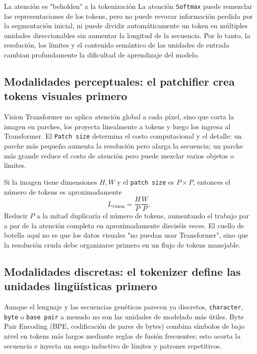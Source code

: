 
\begin{importantbox}{La atención es "beholden" a la tokenización}
La atención \texttt{Softmax} puede remezclar las representaciones de los tokens, pero no puede revocar información perdida por la segmentación inicial, ni puede dividir automáticamente un token en múltiples unidades direccionables sin aumentar la longitud de la secuencia. Por lo tanto, la resolución, los límites y el contenido semántico de las unidades de entrada cambian profundamente la dificultad de aprendizaje del modelo.
\end{importantbox}

\subsection{Modalidades perceptuales: el patchifier crea tokens visuales primero}

Vision Transformer no aplica atención global a cada píxel, sino que corta la imagen en parches, los proyecta linealmente a tokens y luego los ingresa al Transformer. El \texttt{Patch size} determina el costo computacional y el detalle: un parche más pequeño aumenta la resolución pero alarga la secuencia; un parche más grande reduce el costo de atención pero puede mezclar varios objetos o límites.


Si la imagen tiene dimensiones $H,W$ y el \texttt{patch size} es $P\times P$, entonces el número de tokens es aproximadamente
\[
L_{\mathrm{vision}}=\frac{H}{P}\frac{W}{P}.
\]
Reducir $P$ a la mitad duplicaría el número de tokens, aumentando el trabajo par a par de la atención completa en aproximadamente dieciséis veces. El cuello de botella aquí no es que los datos visuales "no puedan usar Transformer", sino que la resolución cruda debe organizarse primero en un flujo de tokens manejable.

\subsection{Modalidades discretas: el tokenizer define las unidades lingüísticas primero}

Aunque el lenguaje y las secuencias genéticas parecen ya discretos, \texttt{character}, \texttt{byte} o \texttt{base pair} a menudo no son las unidades de modelado más útiles. Byte Pair Encoding (BPE, codificación de pares de bytes) combina símbolos de bajo nivel en tokens más largos mediante reglas de fusión frecuentes; esto acorta la secuencia e inyecta un sesgo inductivo de límites y patrones repetitivos.

